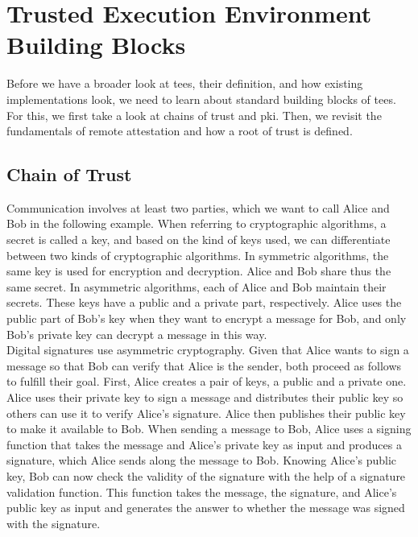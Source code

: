 \section{Trusted Execution Environment Building Blocks}
\label{sec:20:building_blocks}
Before we have a broader look at \glspl{tee}, their definition, and how existing
implementations look, we need to learn about standard building blocks of
\glspl{tee}. For this, we first take a look at chains of trust and \gls{pki}.
Then, we revisit the fundamentals of remote attestation and how a root of
trust is defined.

\subsection{Chain of Trust}
\label{sec:20:chain_of_trust}

Communication involves at least two parties, which we want to call Alice and Bob
in the following example. When referring to cryptographic algorithms, a secret
is called a key, and based on the kind of keys used, we can differentiate
between two kinds of cryptographic algorithms. In symmetric algorithms, the same
key is used for encryption and decryption. Alice and Bob share thus the same
secret. In asymmetric algorithms, each of Alice and Bob maintain their secrets.
These keys have a public and a private part, respectively. Alice uses the public
part of Bob's key when they want to encrypt a message for Bob, and only Bob's
private key can decrypt a message in this way.\\

Digital signatures use asymmetric cryptography. Given that Alice wants to sign a
message so that Bob can verify that Alice is the sender, both proceed as follows
to fulfill their goal. First, Alice creates a pair of keys, a public and a
private one. Alice uses their private key to sign a message and distributes
their public key so others can use it to verify Alice's signature. Alice then
publishes their public key to make it available to Bob. When sending a message
to Bob, Alice uses a signing function that takes the message and Alice's private
key as input and produces a signature, which Alice sends along the message to
Bob. Knowing Alice's public key, Bob can now check the validity of the signature
with the help of a signature validation function. This function takes the
message, the signature, and Alice's public key as input and generates the answer
to whether the message was signed with the signature.\\

